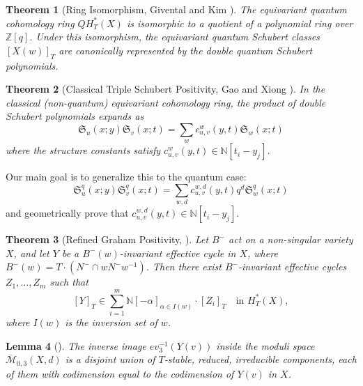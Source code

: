 \documentclass{amsart}
\newtheorem{theorem}{Theorem}[section]
\newtheorem{lemma}[theorem]{Lemma}
\theoremstyle{definition}
\begin{document}
\begin{theorem}[Ring Isomorphism, Givental and Kim \cite{GiventalKim1995}]\label{thm:givental_kim}
The equivariant quantum cohomology ring $QH_T^*(X)$ is isomorphic to a quotient of a polynomial ring over $\mathbb{Z}[q]$. Under this isomorphism, the equivariant quantum Schubert classes $[X(w)]_T$ are canonically represented by the double quantum Schubert polynomials.
\end{theorem}

\begin{theorem}[Classical Triple Schubert Positivity, Gao and Xiong \cite{GaoXiong2023}]\label{thm:classical_triple}
In the classical (non-quantum) equivariant cohomology ring, the product of double Schubert polynomials expands as
\begin{equation}\label{eq:classical_expansion}
\mathfrak{S}_u(x;y) \mathfrak{S}_v(x;t) = \sum_w c_{u,v}^w(y,t) \mathfrak{S}_w(x;t)
\end{equation}
where the structure constants satisfy $c_{u,v}^w(y,t) \in \mathbb{N}[t_i - y_j]$.
\end{theorem}

Our main goal is to generalize this to the quantum case:
\begin{equation}\label{eq:quantum_goal}
\mathfrak{S}_u^q(x;y) \mathfrak{S}_v^q(x;t) = \sum_{w,d} c_{u,v}^{w,d}(y,t) q^d \mathfrak{S}_w^q(x;t)
\end{equation}
and geometrically prove that $c_{u,v}^{w,d}(y,t) \in \mathbb{N}[t_i - y_j]$.

\begin{theorem}[Refined Graham Positivity, {\cite[Theorem 2.3]{GaoXiong2023}}]\label{thm:gao_xiong}
Let $B^-$ act on a non-singular variety $X$, and let $Y$ be a $B^-(w)$-invariant effective cycle in $X$, where $B^-(w) = T \cdot (N^- \cap w N^- w^{-1})$. Then there exist $B^-$-invariant effective cycles $Z_1, \ldots, Z_m$ such that 
$$[Y]_T \in \sum_{i=1}^m \mathbb{N}[-\alpha]_{\alpha \in I(w)} \cdot [Z_i]_T \quad \text{in } H_T^*(X),$$
where $I(w)$ is the inversion set of $w$.
\end{theorem}

\begin{lemma}[{\cite[Lemma 6.4]{Mihalcea2006}}]\label{lem:mihalcea_64}
The inverse image $ev_3^{-1}(Y(v))$ inside the moduli space $\overline{\mathcal{M}}_{0,3}(X,d)$ is a disjoint union of $T$-stable, reduced, irreducible components, each of them with codimension equal to the codimension of $Y(v)$ in $X$.
\end{lemma}
\end{document}
